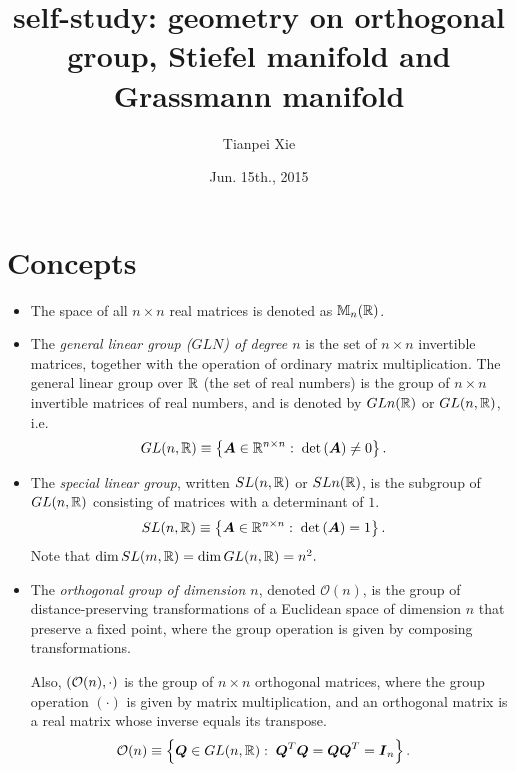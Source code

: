 \documentclass[11pt]{article}
\begin{document}
\title{self-study: geometry on orthogonal group, Stiefel manifold and Grassmann manifold}
\author{ Tianpei Xie}
\date{ Jun. 15th., 2015 }
\maketitle
\tableofcontents
\newpage
\allowdisplaybreaks
\section{Concepts}
\begin{itemize}
\item The space of all $n\times n$ real matrices is denoted as ${\mathbb M}_{n}({\mathbb R})$.

\item The \emph{general linear group ($GLN$) of degree $n$} is the set of $n\times n$ invertible matrices, together with the operation of ordinary matrix multiplication.  The general linear group over ${\mathbb R}$ (the set of real numbers) is the group of $n\times n$ invertible matrices of real numbers, and is denoted by $GLn({\mathbb R})$ or $GL(n, {\mathbb R})$, i.e.
\begin{align*}
GL(n, {\mathbb R}) &\equiv \left\{\boldsymbol{A}\in {\mathbb R}^{n\times n}:\; \det\left(\boldsymbol{A}\right)\neq 0\right\}. 
\end{align*}
 

\item The \emph{special linear group}, written $SL(n, {\mathbb R})$ or $SLn({\mathbb R})$, is the subgroup of $GL(n, {\mathbb R})$ consisting of matrices with a determinant of $1$.
\begin{align*}
SL(n, {\mathbb R}) &\equiv \left\{\boldsymbol{A}\in {\mathbb R}^{n\times n}:\; \det\left(\boldsymbol{A}\right)= 1\right\}. 
\end{align*}
Note that $\dim{SL(m,{\mathbb R})} = \dim{GL(n,{\mathbb R})}= n^{2}.$


\item The \emph{orthogonal group of dimension $n$}, denoted $\mathcal{O}(n)$, is the group of distance-preserving transformations of a Euclidean space of dimension $n$ that preserve a fixed point, where the group operation is given by composing transformations.

 Also, $({\mathcal O}(n), \cdot)$ is the group of $n\times n$ orthogonal matrices, where the group operation $(\cdot)$ is given by matrix multiplication, and an orthogonal matrix is a real matrix whose inverse equals its transpose. 
\begin{align*}
{\mathcal O}(n) &\equiv \left\{\boldsymbol{Q}\in GL(n, {\mathbb R}):\;  \boldsymbol{Q}^{T}\boldsymbol{Q} = \boldsymbol{Q}\boldsymbol{Q}^{T} = \boldsymbol{I}_{n}\right\}.
\end{align*}




\end{itemize}
\end{document}

